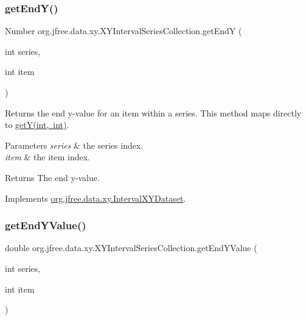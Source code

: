 \subsubsection{\texorpdfstring{get\+End\+Y()}{getEndY()}}
{\footnotesize\ttfamily Number org.\+jfree.\+data.\+xy.\+X\+Y\+Interval\+Series\+Collection.\+get\+EndY (\begin{DoxyParamCaption}\item[{int}]{series,  }\item[{int}]{item }\end{DoxyParamCaption})}

Returns the end y-\/value for an item within a series. This method maps directly to \mbox{\hyperlink{classorg_1_1jfree_1_1data_1_1xy_1_1_x_y_interval_series_collection_a466c1c681b804f65c56985ea65ec2a20}{get\+Y(int, int)}}.


\begin{DoxyParams}{Parameters}
{\em series} & the series index. \\
\hline
{\em item} & the item index.\\
\hline
\end{DoxyParams}
\begin{DoxyReturn}{Returns}
The end y-\/value. 
\end{DoxyReturn}


Implements \mbox{\hyperlink{interfaceorg_1_1jfree_1_1data_1_1xy_1_1_interval_x_y_dataset_ae938af574bad07e7f47a8b423223ef9b}{org.\+jfree.\+data.\+xy.\+Interval\+X\+Y\+Dataset}}.

\mbox{\label{classorg_1_1jfree_1_1data_1_1xy_1_1_x_y_interval_series_collection_af64aae33d2436a5f394e0dd3ebbbbb9f}} 
\subsubsection{\texorpdfstring{get\+End\+Y\+Value()}{getEndYValue()}}
{\footnotesize\ttfamily double org.\+jfree.\+data.\+xy.\+X\+Y\+Interval\+Series\+Collection.\+get\+End\+Y\+Value (\begin{DoxyParamCaption}\item[{int}]{series,  }\item[{int}]{item }\end{DoxyParamCaption})}

